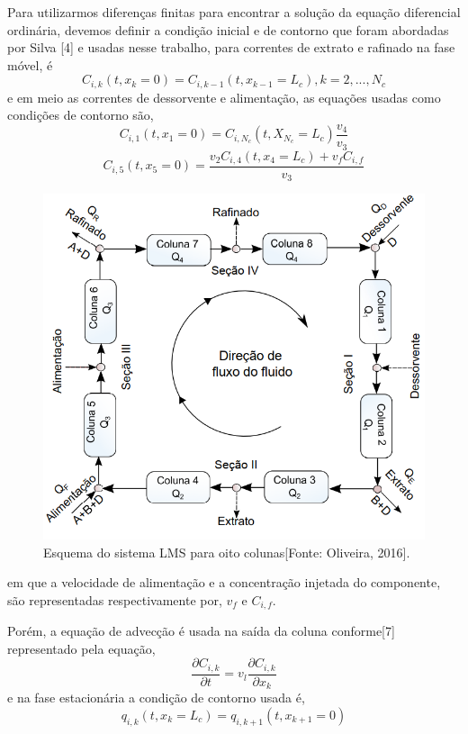 \documentclass[por]{Template_SBEF}
\begin{document}
Para utilizarmos diferenças finitas para encontrar a solução da equação diferencial ordinária, devemos definir a condição inicial e de contorno que foram abordadas por Silva [4] e usadas nesse trabalho, para correntes de extrato e rafinado na fase móvel, é
\begin{equation}
C_{i,k}(t,x_k = 0) = C_{i,k-1}(t, x_{k-1} = L_c), k = 2, ... , N_c
\end{equation}
e em meio as correntes de dessorvente e alimentação, as equações usadas como condições de contorno são,
\begin{equation}
C_{i,1}(t,x_1 = 0) = C_{i,N_c}(t,X_{N_c} = L_c) \frac{v_4}{v_3}
\end{equation}
\begin{equation}
C_{i,5}(t,x_5 = 0) = \frac{v_2 C_{i,4}(t,x_4 = L_c) + v_fC_{i,f}}{v_3} 
\end{equation}

\begin{figure}[!tb] 
 \centering
  \includegraphics[width=.8\columnwidth]{Arquivos/figura1.png} 
 \caption{Esquema do sistema LMS para oito colunas[Fonte: Oliveira, 2016].} \label{fig-1}
\end{figure}

em que a velocidade de alimentação e a concentração injetada do componente, são representadas respectivamente por, $v_f$ e $C_{i,f}$.

Porém, a equação de advecção é usada na saída da coluna conforme[7] representado pela equação,
\begin{equation}
\frac{\partial C_{i,k}}{\partial t} = v_l \frac{\partial C_{i,k}}{\partial x_k}
\end{equation}
 e na fase estacionária a condição de contorno usada é,
 \begin{equation}
 q_{i,k}(t,x_k = L_c) = q_{i,k+1}(t, x_{k+1} = 0)
 \end{equation}
\end{document}
